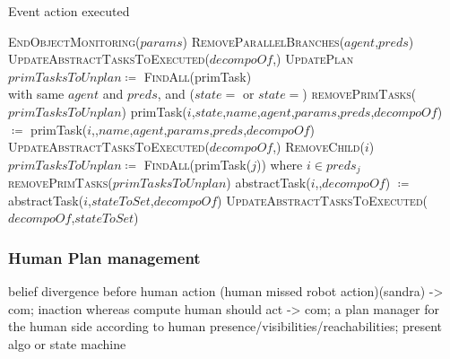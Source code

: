 \documentclass[a4paper,11pt,twoside]{StyleThese}
\begin{document}
\begin{algorithm}[!htb]
	\caption{Event action executed}
	\label{chap2:algo:executed}
	\begin{algorithmic}
		\State \textsc{EndObjectMonitoring($params$)}
		\State \textsc{RemoveParallelBranches($agent$,$preds$)}
		\State \textsc{UpdateAbstractTasksToExecuted($decompoOf$,)}
		\State \textsc{UpdatePlan} 
	\EndFunction
	\Statex
		\State $primTasksToUnplan \coloneqq$ \textsc{FindAll}(primTask) 
		\\\hfill with same $agent$ and $preds$, and ($state=$ or $state=$) 
		\State \textsc{removePrimTasks}($primTasksToUnplan$)
	\EndFunction
	\Statex
			\State primTask($i$,$state$,$name$,$agent$,$params$,$preds$,$decompoOf$) 
			\\\hfill $\coloneqq$ primTask($i$,,$name$,$agent$,$params$,$preds$,$decompoOf$)
			\State \textsc{UpdateAbstractTasksToExecuted($decompoOf$,)}
			\State \textsc{RemoveChild($i$)}
		\EndFor
	\EndFunction
	\Statex
		\State $primTasksToUnplan \coloneqq$ \textsc{FindAll}(primTask($j$)) where $i \in preds_j$ 
		\State \textsc{removePrimTasks}($primTasksToUnplan$)
	\EndFunction
	\Statex
			\State abstractTask($i$,,$decompoOf$) $\coloneqq$ abstractTask($i$,$stateToSet$,$decompoOf$)
			\State \textsc{UpdateAbstractTasksToExecuted($decompoOf$,$stateToSet$)}
		\EndIf
	\EndFunction	
	\end{algorithmic}
\end{algorithm}		

\clearpage
\subsubsection{Human Plan management}\label{chap2:subsubsec:human_plan}
belief divergence before human action (human missed robot action)(sandra) -> com; 
inaction whereas compute human should act -> com;
a plan manager for the human side according to human presence/visibilities/reachabilities;
present algo or state machine
\end{document}
